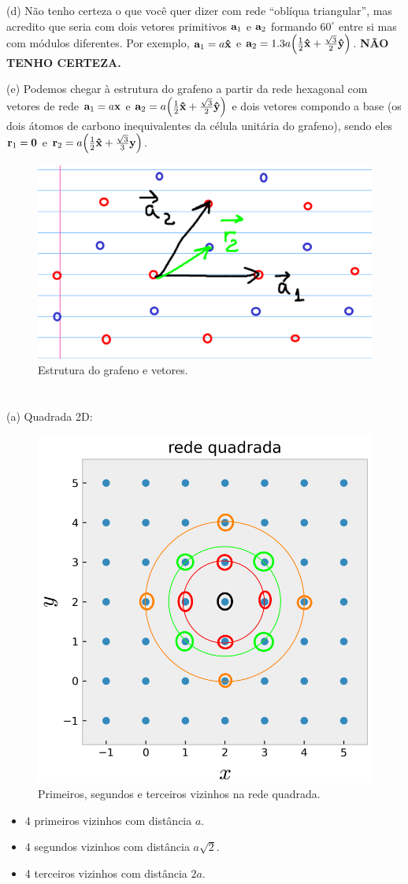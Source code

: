 \documentclass[a4paper,10pt]{article}
\begin{document}
(d) Não tenho certeza o que você quer dizer com rede ``oblíqua triangular'', mas acredito que seria com dois vetores primitivos $\vb{a}_1$ e $\vb{a}_2$ formando $60^\circ$ entre si mas com módulos diferentes. Por exemplo, $\vb{a}_1 = a \vu{x}$ e $\vb{a}_2 = 1.3 a \qty(\frac{1}{2} \vu{x} + \frac{\sqrt{3}}{2} \vu{y})$. \textbf{NÃO TENHO CERTEZA.}

\n

(e) Podemos chegar à estrutura do grafeno a partir da rede hexagonal com vetores de rede $\vb{a}_1 = a \vb{x}$ e $\vb{a}_2 = a \qty(\frac{1}{2} \vu{x} + \frac{\sqrt{3}}{2} \vu{y})$ e dois vetores compondo a base (os dois átomos de carbono inequivalentes da célula unitária do grafeno), sendo eles $\vb{r}_1 = \vb{0}$ e $\vb{r}_2 = a \qty(\frac{1}{2}\vu{x} + \frac{\sqrt{3}}{3}\vb{y})$.
\begin{figure}[H]
\centering
\includegraphics[width=0.4\linewidth]{fig/graphene_vec}
\caption{Estrutura do grafeno e vetores.}
\label{fig:graphene_vec}
\end{figure}

\section{}

(a) Quadrada 2D:
\begin{figure}[H]
\centering
\includegraphics[width=0.3\linewidth]{fig/nn_quad}
\caption{Primeiros, segundos e terceiros vizinhos na rede quadrada.}
\label{fig:nn_quad}
\end{figure}
\begin{itemize}
\item 4 primeiros vizinhos com distância $a$.
\item 4 segundos vizinhos com distância $a\sqrt{2}$.
\item 4 terceiros vizinhos com distância $2a$.
\end{itemize}
\end{document}
